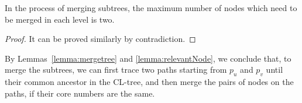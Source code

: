 %
%
%

\begin{lemma}
\label{lemma:relevantNode}
In the process of merging subtrees, the maximum number of nodes which need to be merged in each level is two.
\end{lemma}
\begin{proof}
It can be proved similarly by contradiction.
\end{proof}

By Lemmas~\ref{lemma:mergetree} and \ref{lemma:relevantNode}, we conclude that,
to merge the subtrees, we can first trace two paths starting from $p_u$ and $p_v$ until their common ancestor in the CL-tree,
and then merge the pairs of nodes on the paths, if their core numbers are the same.

